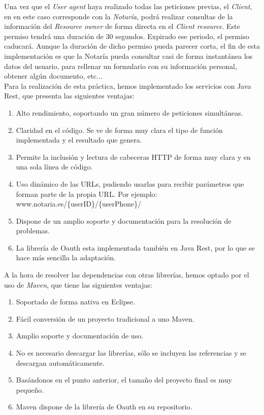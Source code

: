 \documentclass[a4,12pt,onecolum]{article}
\begin{document}
Una vez que el \emph{User agent} haya realizado todas las peticiones previas, el \emph{Client}, en en este caso corresponde con la \emph{Notaría}, podrá realizar consultas de la información del \emph{Resource owner} de forma directa en el \emph{Client resource}. Este permiso tendrá una duración de 30 segundos. Expirado ese periodo, el permiso caducará. Aunque la duración de dicho permiso pueda parecer corta, el fin de esta implementación es que la Notaría pueda consultar casi de forma instantánea los datos del usuario, para rellenar  un formulario con su información personal, obtener algún documento, etc... \\

Para la realización de esta práctica, hemos implementado los servicios con Java Rest, que presenta las siguientes ventajas:
\begin{enumerate}
	\item Alto rendimiento, soportando un gran número de peticiones simultáneas.
	\item Claridad en el código. Se ve de forma muy clara el tipo de función implementada y el resultado que 		genera.
	\item Permite la inclusión y lectura de cabeceras HTTP de forma muy clara y en una sola línea de código.
	\item Uso dinámico de las URLs, pudiendo usarlas para recibir parámetros que forman parte de la propia URL. Por ejemplo: www.notaria.es/\{userID\}/\{userPhone\}/
	\item Dispone de un amplio soporte y documentación para la resolución de problemas.
	\item La librería de Oauth esta implementada también en Java Rest, por lo que se hace más sencilla la 			adaptación. \\
\end{enumerate}

A la hora de resolver las dependencias con otras librerías, hemos optado por el uso de \emph{Maven}, que tiene las siguientes ventajas:
\begin{enumerate}
	\item Soportado de forma nativa en Eclipse.
	\item Fácil conversión de un proyecto tradicional a uno Maven.
	\item Amplio soporte y documentación de uso.
	\item No es necesario descargar las librerías, sólo se incluyen las referencias y se descargan automáticamente.
	\item Basándonos en el punto anterior, el tamaño del proyecto final es muy pequeño.
	\item Maven dispone de la librería de Oauth en su repositorio.
\end{enumerate}
\end{document}
